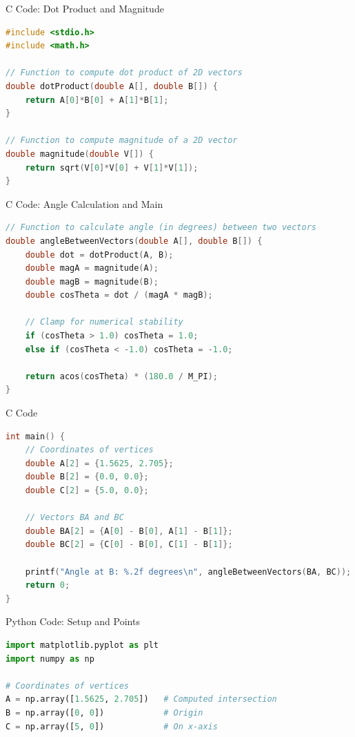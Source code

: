 \documentclass{beamer}
\begin{document}
\begin{frame}[fragile]{C Code: Dot Product and Magnitude}
\begin{lstlisting}[language=C]
#include <stdio.h>
#include <math.h>

// Function to compute dot product of 2D vectors
double dotProduct(double A[], double B[]) {
    return A[0]*B[0] + A[1]*B[1];
}

// Function to compute magnitude of a 2D vector
double magnitude(double V[]) {
    return sqrt(V[0]*V[0] + V[1]*V[1]);
}
\end{lstlisting}
\end{frame}

\begin{frame}[fragile]{C Code: Angle Calculation and Main}
\begin{lstlisting}[language=C]
// Function to calculate angle (in degrees) between two vectors
double angleBetweenVectors(double A[], double B[]) {
    double dot = dotProduct(A, B);
    double magA = magnitude(A);
    double magB = magnitude(B);
    double cosTheta = dot / (magA * magB);

    // Clamp for numerical stability
    if (cosTheta > 1.0) cosTheta = 1.0;
    else if (cosTheta < -1.0) cosTheta = -1.0;

    return acos(cosTheta) * (180.0 / M_PI);
}
\end{lstlisting}
\end{frame}

\begin{frame}[fragile]{C Code}
\begin{lstlisting}[language=C]
int main() {
    // Coordinates of vertices
    double A[2] = {1.5625, 2.705};
    double B[2] = {0.0, 0.0};
    double C[2] = {5.0, 0.0};

    // Vectors BA and BC
    double BA[2] = {A[0] - B[0], A[1] - B[1]};
    double BC[2] = {C[0] - B[0], C[1] - B[1]};

    printf("Angle at B: %.2f degrees\n", angleBetweenVectors(BA, BC));
    return 0;
}
\end{lstlisting}
\end{frame}


\begin{frame}[fragile]{Python Code: Setup and Points}
\begin{lstlisting}[language=Python]
import matplotlib.pyplot as plt
import numpy as np

# Coordinates of vertices
A = np.array([1.5625, 2.705])   # Computed intersection
B = np.array([0, 0])            # Origin
C = np.array([5, 0])            # On x-axis
\end{lstlisting}
\end{frame}
\end{document}
